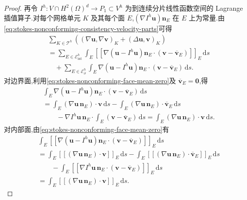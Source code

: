 \begin{proof}
再令 $I^h:V\cap H^2(\Omega)^d\to P_1\subset V^h$ 为到连续分片线性函数空间的 Lagrange 插值算子.对每个网格单元 $K$ 及其每个面 $E$,$(\nabla I^h\bm{u})\bm{n}_E$ 在 $E$ 上为常量.由\cref{eq:stokes-nonconforming-consistency-velocity-parts}可得
\begin{equation}\label{eq:stokes-nonconforming-consistency-velocity-interpolation}
\begin{aligned}
  &\sum_{K\in\mathcal{T}^h}
      \left((\nabla\bm{u},\nabla\bm{v})_K
            +(\Delta\bm{u},\bm{v})_K\right)\\
  &=\sum_{E\in\mathcal{E}_{\mathrm{int}}^h}
      \int_E\left[\!\left[
        \nabla(\bm{u}-I^h\bm{u})\bm{n}_E
        \cdot(\bm{v}-\overline{\bm{v}}_E)
      \right]\!\right]_E\,\mathrm{d}s\\
  &\quad+\sum_{E\in\mathcal{E}_{\partial}^h}
      \int_E\nabla(\bm{u}-I^h\bm{u})\bm{n}_E
       \cdot(\bm{v}-\overline{\bm{v}}_E)\,\mathrm{d}s.
\end{aligned}
\end{equation}
对边界面,利用\cref{eq:stokes-nonconforming-face-mean-zero}及 $\overline{\bm{v}}_E=\bm{0}$,得
\[
\begin{aligned}
  &\int_E\nabla(\bm{u}-I^h\bm{u})\bm{n}_E
       \cdot(\bm{v}-\overline{\bm{v}}_E)\,\mathrm{d}s\\
  &=\int_E(\nabla\bm{u}\,\bm{n}_E)\cdot\bm{v}\,\mathrm{d}s
    -\int_E(\nabla\bm{u}\,\bm{n}_E)
        \cdot\overline{\bm{v}}_E\,\mathrm{d}s\\
  &\qquad-\nabla I^h\bm{u}\,\bm{n}_E
       \cdot\int_E(\bm{v}-\overline{\bm{v}}_E)\,\mathrm{d}s
   =\int_E(\nabla\bm{u}\,\bm{n}_E)\cdot\bm{v}\,\mathrm{d}s.
\end{aligned}
\]
对内部面,由\cref{eq:stokes-nonconforming-face-mean-zero}有
\[
\begin{aligned}
  &\int_E\left[\!\left[
       \nabla(\bm{u}-I^h\bm{u})\bm{n}_E
       \cdot(\bm{v}-\overline{\bm{v}}_E)
       \right]\!\right]_E\,\mathrm{d}s\\
  &=\int_E\left[\!\left[
       (\nabla\bm{u}\,\bm{n}_E)\cdot\bm{v}
       \right]\!\right]_E\,\mathrm{d}s
    -\int_E\left[\!\left[
       (\nabla\bm{u}\,\bm{n}_E)
       \cdot\overline{\bm{v}}_E
       \right]\!\right]_E\,\mathrm{d}s\\
  &\qquad-\int_E\left[\!\left[
       \nabla I^h\bm{u}\,\bm{n}_E
       \cdot(\bm{v}-\overline{\bm{v}}_E)
       \right]\!\right]_E\,\mathrm{d}s\\
  &=\int_E\left[\!\left[
       (\nabla\bm{u}\,\bm{n}_E)\cdot\bm{v}
       \right]\!\right]_E\,\mathrm{d}s.

\end{aligned}\]
\end{proof}
